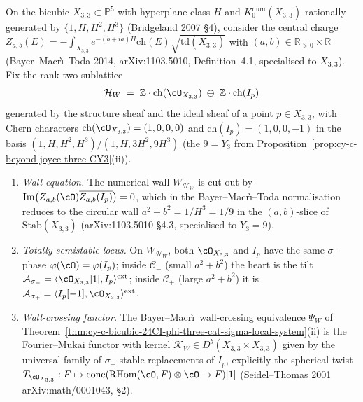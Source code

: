\begin{proposition}
\label{prop:cy-c-bicubic-explicit-wall}
On the bicubic $X_{3,3} \subset \mathbb P^5$ with hyperplane class $H$
and $K_0^{\mathrm{num}}(X_{3,3})$ rationally generated by
$\{1, H, H^2, H^3\}$ (Bridgeland 2007 \S 4), consider the central
charge $Z_{a,b}(E) = -\int_{X_{3,3}} e^{-(b+ia)H} \mathrm{ch}(E)
\sqrt{\mathrm{td}(X_{3,3})}$ with $(a, b) \in \mathbb R_{>0} \times
\mathbb R$ (Bayer--Macr\`\i--Toda 2014, arXiv:1103.5010, Definition~4.1,
specialised to $X_{3,3}$). Fix the rank-two sublattice
\[
 \mathcal H_W \;=\; \mathbb Z \cdot \mathrm{ch}(\cO_{X_{3,3}})
 \;\oplus\; \mathbb Z \cdot \mathrm{ch}(I_p)
\]
generated by the structure sheaf and the ideal sheaf of a point
$p \in X_{3,3}$, with Chern characters
$\mathrm{ch}(\cO_{X_{3,3}}) = (1, 0, 0, 0)$ and
$\mathrm{ch}(I_p) = (1, 0, 0, -1)$ in the basis
$(1, H, H^2, H^3)/(1, H, 3H^2, 9H^3)$ (the $9 = Y_3$ from
Proposition~\ref{prop:cy-c-beyond-joyce-three-CY3}(ii)).
\begin{enumerate}[label=\textup{(\roman*)}]
 \item \emph{Wall equation.} The numerical wall $W_{\mathcal H_W}$ is
 cut out by
 $\mathrm{Im}\bigl(Z_{a,b}(\cO) \overline{Z_{a,b}(I_p)}\bigr) = 0$,
 which in the Bayer--Macr\`\i--Toda normalisation reduces to
 the circular wall $a^2 + b^2 = 1/H^3 = 1/9$ in the $(a, b)$-slice
 of $\mathrm{Stab}(X_{3,3})$ (arXiv:1103.5010 \S 4.3, specialised
 to $Y_3 = 9$).
 \item \emph{Totally-semistable locus.} On $W_{\mathcal H_W}$, both
 $\cO_{X_{3,3}}$ and $I_p$ have the same $\sigma$-phase
 $\varphi(\cO) = \varphi(I_p)$; inside $\mathcal C_-$ (small
 $a^2+b^2$) the heart is the tilt $\mathcal A_{\sigma_-} =
 \langle \cO_{X_{3,3}}[1], I_p \rangle^{\mathrm{ext}}$; inside
 $\mathcal C_+$ (large $a^2+b^2$) it is
 $\mathcal A_{\sigma_+} = \langle I_p[-1], \cO_{X_{3,3}}
 \rangle^{\mathrm{ext}}$.
 \item \emph{Wall-crossing functor.} The Bayer--Macr\`\i\ wall-crossing
 equivalence $\Psi_W$ of
 Theorem~\ref{thm:cy-c-bicubic-24CI-phi-three-cat-sigma-local-system}(ii)
 is the Fourier--Mukai functor with kernel
 $\mathcal K_W \in D^b(X_{3,3} \times X_{3,3})$ given by the
 universal family of $\sigma_+$-stable replacements of $I_p$,
 explicitly the spherical twist
 $T_{\cO_{X_{3,3}}} : F \mapsto \mathrm{cone}(\mathrm{RHom}(\cO, F)
 \otimes \cO \to F)[1]$ (Seidel--Thomas 2001
 arXiv:math/0001043, \S 2).

\end{enumerate}
\end{proposition}
